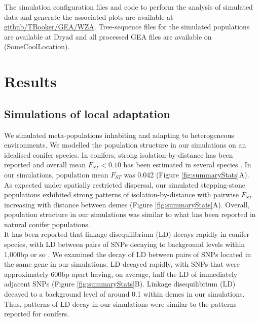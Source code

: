 \documentclass[10pt,twoside,lineno, twocolumn]{GSA_format}
\begin{document}
The simulation configuration files and code to perform the analysis of simulated data and generate the associated plots are available at \url{github/TBooker/GEA/WZA}. Tree-sequence files for the simulated populations are available at Dryad and all processed GEA files are available on (SomeCoolLocation). 

\section{Results}

\subsection{Simulations of local adaptation}

We simulated meta-populations inhabiting and adapting to heterogeneous environments. We modelled the population structure in our simulations on an idealised conifer species. In conifers, strong isolation-by-distance has been reported and overall mean $F_{ST} < 0.10$ has been estimated in several species \citep{Mimura2007,Mosca2014}. In our simulations, population mean $F_{ST}$ was 0.042 (Figure \ref{fig:summaryStats}A). As expected under spatially restricted dispersal, our simulated stepping-stone populations exhibited strong patterns of isolation-by-distance with pairwise $F_{ST}$ increasing with distance between demes (Figure \ref{fig:summaryStats}A). Overall, population structure in our simulations was similar to what has been reported in natural conifer populations.\\

It has been reported that linkage disequilibrium (LD) decays rapidly in conifer species, with LD between pairs of SNPs decaying to background levels within 1,000bp or so \citep{Pavy2012}. We examined the decay of LD between pairs of SNPs located in the same gene in our simulations. LD decayed rapidly, with SNPs that were approximately 600bp apart having, on average, half the LD of immediately adjacent SNPs (Figure \ref{fig:summaryStats}B). Linkage disequilibrium (LD) decayed to a background level of around 0.1  within demes in our simulations. Thus, patterns of LD decay in our simulations were similar to the patterns reported for conifers.\\
\end{document}
